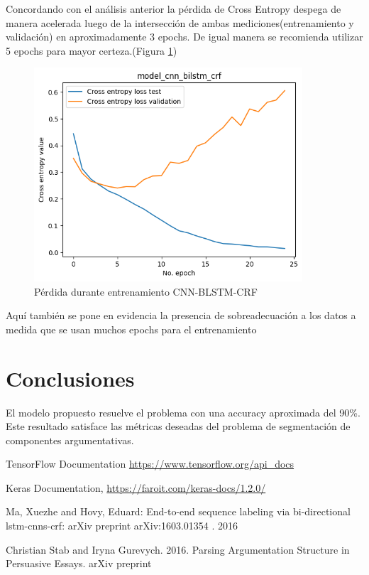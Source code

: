 \documentclass[runningheads]{llncs}
\begin{document}
Concordando con el análisis anterior la pérdida de Cross Entropy despega de manera acelerada luego de la intersección de ambas mediciones(entrenamiento y validación) en aproximadamente 3 epochs. De igual manera se recomienda utilizar 5 epochs para mayor certeza.(Figura \ref{loss_fig})
\begin{figure}
	\centering
	\includegraphics[width=10cm]{model_cnn_BiLSTM_crf_loss.png}
	\caption{Pérdida durante entrenamiento CNN-BLSTM-CRF}
	\label{loss_fig}
\end{figure}

Aquí también se pone en evidencia la presencia de sobreadecuación a los datos a medida que se usan muchos epochs para el entrenamiento
\section{Conclusiones}

El modelo propuesto resuelve el problema con una accuracy aproximada del 90\%. Este
resultado satisface las métricas deseadas del problema de segmentación de componentes
argumentativas. 

\begin{thebibliography}{8}

TensorFlow Documentation \url{https://www.tensorflow.org/api_docs} 

Keras Documentation, \url{https://faroit.com/keras-docs/1.2.0/}

Ma, Xuezhe and Hovy, Eduard:
End-to-end sequence labeling via bi-directional lstm-cnns-crf:
arXiv preprint arXiv:1603.01354 . 2016 

Christian Stab and Iryna Gurevych. 2016. Parsing Argumentation Structure in 
Persuasive Essays. arXiv preprint

\end{thebibliography}
\end{document}
